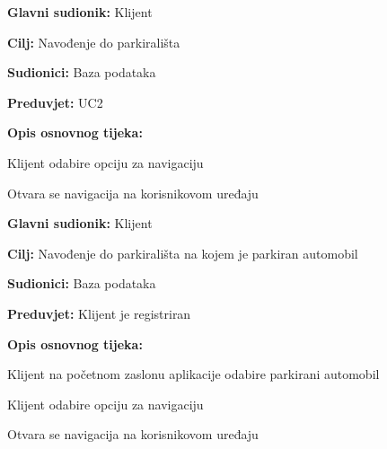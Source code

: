\noindent {}
\begin{packed_item}
	
	\item \textbf{Glavni sudionik:} Klijent
	\item  \textbf{Cilj:} Navođenje do parkirališta
	\item  \textbf{Sudionici:} Baza podataka
	\item  \textbf{Preduvjet:} UC2
	\item  \textbf{Opis osnovnog tijeka:}
	
	\item[] \begin{packed_enum}
		
		\item Klijent odabire opciju za navigaciju
		\item Otvara se navigacija na korisnikovom uređaju
		
	\end{packed_enum}
\end{packed_item}

\pagebreak

\noindent {}
\begin{packed_item}
	
	\item \textbf{Glavni sudionik:} Klijent
	\item  \textbf{Cilj:} Navođenje do parkirališta na kojem je parkiran automobil
	\item  \textbf{Sudionici:} Baza podataka
	\item  \textbf{Preduvjet:} Klijent je registriran
	\item  \textbf{Opis osnovnog tijeka:}
	
	\item[] \begin{packed_enum}
		
		\item Klijent na početnom zaslonu aplikacije odabire parkirani automobil
		\item Klijent odabire opciju za navigaciju
		\item Otvara se navigacija na korisnikovom uređaju
		
	\end{packed_enum}
\end{packed_item}


